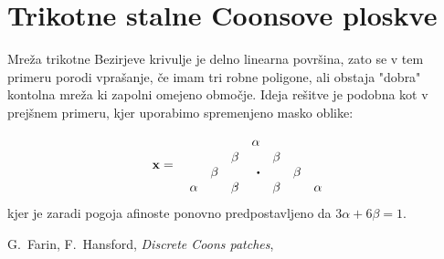 \documentclass[a4paper,12pt]{article}
\begin{document}
\section{Trikotne stalne Coonsove ploskve}

Mreža trikotne Bezirjeve krivulje je delno linearna površina, zato se v tem primeru porodi vprašanje,
če imam tri robne poligone, ali obstaja "dobra" kontolna mreža ki zapolni omejeno območje. Ideja rešitve je
podobna kot v prejšnem primeru, kjer uporabimo spremenjeno masko oblike:

$$
\mathbf{x} =  \quad 
\begin{matrix*}[r]
          &       &       & \alpha   &       &       & \\
          &       & \beta &          & \beta &       & \\
          & \beta &       & \sbullet &       & \beta & \\
   \alpha &       & \beta &          & \beta &       & \alpha
\end{matrix*}
$$
kjer je zaradi pogoja afinoste ponovno predpostavljeno da $3\alpha + 6\beta = 1$.




















\newpage


\newpage

\begin{thebibliography}{99}
   G.~Farin, F.~Hansford, \emph{Discrete Coons patches}, 
\end{thebibliography}
\end{document}
